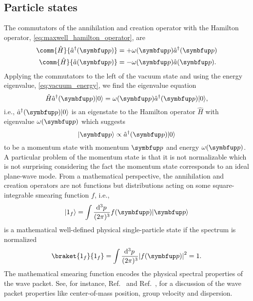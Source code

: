 \subsection{Particle states}

The commutators of the annihilation and creation operator with the Hamilton operator, \cref{eq:maxwell_hamilton_operator}, are
\begin{align}
	\comm{\hat{H}}{\hat{a}^\dagger(\vb{p})}
	&=
	+
	\omega(\vb{p})
	\hat{a}^\dagger(\vb{p})
	\\
	\comm{\hat{H}}{\hat{a}(\vb{p})}
	&=
	-
	\omega(\vb{p})
	\hat{a}(\vb{p})
	.
\end{align}
Applying the commutators to the left of the vacuum state and using the energy eigenvalue, \cref{eq:vacuum_energy}, we find the eigenvalue equation
\begin{equation}
	\hat{H}
	\hat{a}^\dagger(\vb{p})
	\ket{0}
	=
	\omega(\vb{p})
	\hat{a}^\dagger(\vb{p})
	\ket{0}
	\label{eq:creation_energy_eigenstate}
	,
\end{equation}
i.e., $\hat{a}^\dagger(\vb{p})\ket{0}$ is an eigenstate to the Hamilton operator $\hat{H}$ with eigenvalue $\omega(\vb{p})$ which suggests
\begin{equation}
	\ket{\vb{p}}
	\propto
	\hat{a}^\dagger(\vb{p})
	\ket{0}
	\label{eq:momentum_state}
\end{equation}
to be a momentum state with momentum $\vb{p}$ and energy $\omega(\vb{p})$.
A particular problem of the momentum state is that it is not normalizable which is not surprising considering the fact the momentum state corresponds to an ideal plane-wave mode.
From a mathematical perspective, the annihilation and creation operators are not functions but distributions acting on some square-integrable smearing function $f$, i.e.,
\begin{equation}
	\ket{1_f}
	=
	\int\frac{\dd[3]{p}}{(2\pi)^3}
	f(\vb{p})
	\ket{\vb{p}}
	\label{eq:single_particle_state}
\end{equation}
is a mathematical well-defined physical single-particle state if the spectrum is normalized
\begin{equation}
	\braket{1_f}{1_f}
	=
	\int\frac{\dd[3]{p}}{(2\pi)^3}
	\abs*{f(\vb{p})}^2
	=
	1
	.
\end{equation}
The mathematical smearing function encodes the physical spectral properties of the wave packet.
See, for instance, Ref.~\cite{Naumov2013} and Ref.~\cite{Naumov2009}, for a discussion of the wave packet properties like center-of-mass position, group velocity and dispersion.

